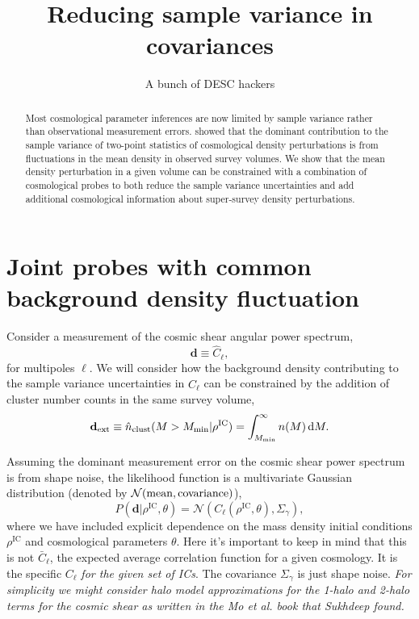 \documentclass[preprint]{aastex}
\newcommand{\data}{\mathbf{d}}
\newcommand{\dataext}{\data_{\rm ext}}
\newcommand{\normdist}{\mathcal{N}}
\begin{document}
\title{Reducing sample variance in covariances}

\author{A bunch of DESC hackers}
\begin{abstract}
Most cosmological parameter inferences are now limited by sample variance rather than 
observational measurement errors. \citet{takada2013} showed that the dominant contribution 
to the sample variance of two-point statistics of cosmological density perturbations is from 
fluctuations in the mean density in observed survey volumes. 
We show that the mean density perturbation in a given volume can be constrained with a combination of 
cosmological probes to both reduce the sample variance uncertainties and add additional 
cosmological information about super-survey density perturbations.
\end{abstract}



\section{Joint probes with common background density fluctuation} %
\label{sec:joint_probes}

Consider a measurement of the cosmic shear angular power spectrum,
\begin{equation}
	\data \equiv \hat{C}_{\ell},
\end{equation}
for multipoles $\ell$.
We will consider how the background density contributing to the sample variance 
uncertainties in $\hat{C}_{\ell}$ can be constrained by the 
addition of cluster number counts in the same survey volume,
\begin{equation}
	\dataext \equiv \hat{n}_\text{clust}(M>M_\text{min} | \rho^\text{IC}) =
	\int_{M_\text{min}}^{\infty} n(M)\,\mathrm{d}M.
\end{equation}

Assuming the dominant measurement error on the cosmic shear power spectrum is from shape noise,
the likelihood function is a multivariate Gaussian distribution (denoted by $\normdist({\rm mean}, {\rm covariance})$),
\begin{equation}
	P(\data|\rho^\text{IC},\theta) = \normdist(C_{\ell}(\rho^\text{IC},\theta), \Sigma_{\gamma}),
\end{equation}
where we have included explicit dependence on the mass density initial conditions $\rho^\text{IC}$ 
and cosmological parameters $\theta$.
Here it's important to keep in mind that this is not $\bar{C}_{\ell}$, the expected average correlation
function for a given cosmology.  It is the specific $C_{\ell}$ {\em for the given set of ICs}. The
covariance $\Sigma_{\gamma}$ is just shape noise.  {\it For simplicity we might consider halo model
approximations for the 1-halo and 2-halo terms for the cosmic shear as written in the Mo et al. book
that Sukhdeep found.}
\end{document}
